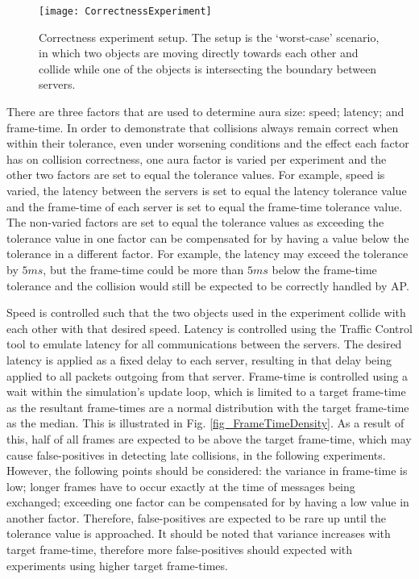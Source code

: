 \begin{figure}
	\centering
	\texttt{[image: CorrectnessExperiment]}
	\caption{Correctness experiment setup. The setup is the `worst-case' scenario, in which two objects are moving directly towards each other and collide while one of the objects is intersecting the boundary between servers.}
	\label{fig_CorrectnessExperiment}
\end{figure}

There are three factors that are used to determine aura size: speed; latency; and frame-time. In order to demonstrate that collisions always remain correct when within their tolerance, even under worsening conditions and the effect each factor has on collision correctness, one aura factor is varied per experiment and the other two factors are set to equal the tolerance values. For example, speed is varied, the latency between the servers is set to equal the latency tolerance value and the frame-time of each server is set to equal the frame-time tolerance value. The non-varied factors are set to equal the tolerance values as exceeding the tolerance value in one factor can be compensated for by having a value below the tolerance in a different factor. For example, the latency may exceed the tolerance by $5ms$, but the frame-time could be more than $5ms$ below the frame-time tolerance and the collision would still be expected to be correctly handled by AP.

Speed is controlled such that the two objects used in the experiment collide with each other with that desired speed. Latency is controlled using the Traffic Control tool to emulate latency for all communications between the servers. The desired latency is applied as a fixed delay to each server, resulting in that delay being applied to all packets outgoing from that server. Frame-time is controlled using a wait within the simulation's update loop, which is limited to a target frame-time as the resultant frame-times are a normal distribution with the target frame-time as the median. This is illustrated in Fig. \ref{fig_FrameTimeDensity}. As a result of this, half of all frames are expected to be above the target frame-time, which may cause false-positives in detecting late collisions, in the following experiments. However, the following points should be considered: the variance in frame-time is low; longer frames have to occur exactly at the time of messages being exchanged; exceeding one factor can be compensated for by having a low value in another factor. Therefore, false-positives are expected to be rare up until the tolerance value is approached. It should be noted that variance increases with target frame-time, therefore more false-positives should expected with experiments using higher target frame-times.

